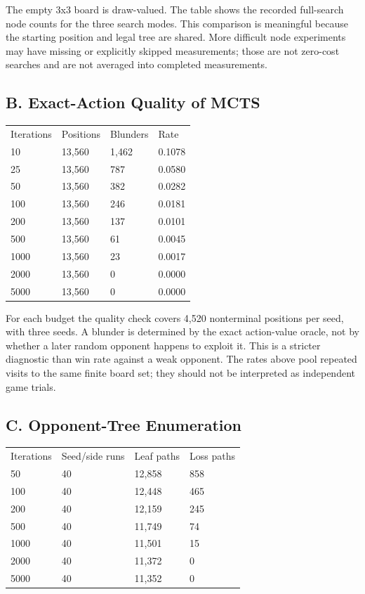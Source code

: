 \documentclass[conference]{IEEEtran}
\begin{document}
The empty 3x3 board is draw-valued. The table shows the recorded full-search node counts for the three search modes. This comparison is meaningful because the starting position and legal tree are shared. More difficult node experiments may have missing or explicitly skipped measurements; those are not zero-cost searches and are not averaged into completed measurements.


\subsection{B. Exact-Action Quality of MCTS}

\begin{center}\scriptsize\begin{tabular}{llll}\hline
Iterations & Positions & Blunders & Rate \\
10 & 13,560 & 1,462 & 0.1078 \\
25 & 13,560 & 787 & 0.0580 \\
50 & 13,560 & 382 & 0.0282 \\
100 & 13,560 & 246 & 0.0181 \\
200 & 13,560 & 137 & 0.0101 \\
500 & 13,560 & 61 & 0.0045 \\
1000 & 13,560 & 23 & 0.0017 \\
2000 & 13,560 & 0 & 0.0000 \\
5000 & 13,560 & 0 & 0.0000 \\
\hline\end{tabular}\end{center}

For each budget the quality check covers 4,520 nonterminal positions per seed, with three seeds. A blunder is determined by the exact action-value oracle, not by whether a later random opponent happens to exploit it. This is a stricter diagnostic than win rate against a weak opponent. The rates above pool repeated visits to the same finite board set; they should not be interpreted as independent game trials.


\subsection{C. Opponent-Tree Enumeration}

\begin{center}\scriptsize\begin{tabular}{llll}\hline
Iterations & Seed/side runs & Leaf paths & Loss paths \\
50 & 40 & 12,858 & 858 \\
100 & 40 & 12,448 & 465 \\
200 & 40 & 12,159 & 245 \\
500 & 40 & 11,749 & 74 \\
1000 & 40 & 11,501 & 15 \\
2000 & 40 & 11,372 & 0 \\
5000 & 40 & 11,352 & 0 \\
\hline\end{tabular}\end{center}
\end{document}
